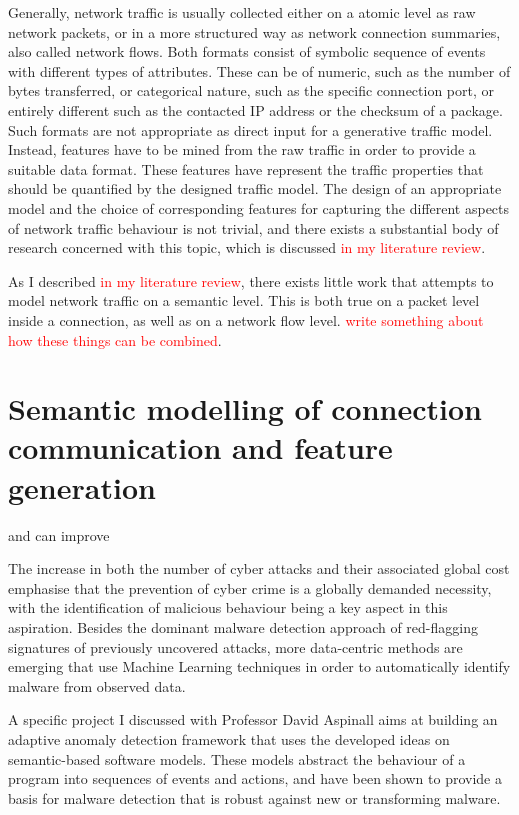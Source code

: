 \documentclass[a4paper,12pt,twoside]{report}
\begin{document}
Generally, network traffic is usually collected either on a atomic level as raw network packets, or in a more structured way as network connection summaries, also called network flows. Both formats consist of symbolic sequence of events with different types of attributes. These can be of numeric, such as the number of bytes transferred, or categorical nature, such as the specific connection port, or entirely different such as the contacted IP address or the checksum of a package. Such formats are not appropriate as direct input for a generative traffic model. Instead, features have to be mined from the raw traffic in order to provide a suitable data format. These features have represent the traffic properties that should be quantified by the designed traffic model. The design of an appropriate model and the choice of corresponding features for capturing the different aspects of network traffic behaviour is not trivial, and there exists a substantial body of research concerned with this topic, which is discussed \textcolor{red}{in my literature review}. 


As I described \textcolor{red}{in my literature review}, there exists little work that attempts to model network traffic on a semantic level. This is both true on a packet level inside a connection, as well as on a network flow level. \textcolor{red}{write something about how these things can be combined}.


\section*{Semantic modelling of connection communication and feature generation}

 and can improve 









The increase in both the number of cyber attacks and their associated global cost emphasise that the prevention of cyber crime is a globally demanded necessity, with the identification of malicious behaviour being a key aspect in this aspiration. Besides the dominant malware detection approach of red-flagging signatures of previously uncovered attacks, more data-centric methods are emerging that use Machine Learning techniques in order to automatically identify malware from observed data.%

A specific project I discussed with Professor David Aspinall aims at building an adaptive anomaly detection framework that uses the developed ideas on semantic-based software models. These models abstract the behaviour of a program into sequences  of  events and  actions, and have been shown to provide a  basis for malware detection that is robust against new or transforming malware.
\end{document}
